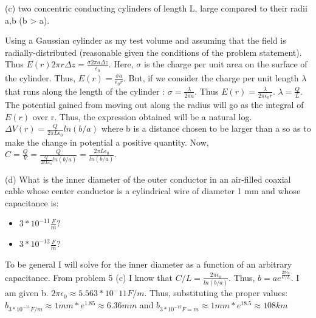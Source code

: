 \begin{homeworkProblem}
\begin{homeworkSection}{(c)}
two concentric conducting cylinders of length L, large compared to their radii a,b (b > a). 

Using a Gaussian cylinder as my test volume and assuming that the field is radially-distributed (reasonable given the conditions of the problem statement). Thus $E(r) 2 \pi r \Delta z = \frac{\sigma 2 \pi a \Delta z}{\epsilon_0}$. Here, $\sigma$ is the charge per unit area on the surface of the cylinder. Thus, $E(r) = \frac{\sigma a}{\epsilon_0 r}$. But, if we consider the charge per unit length $\lambda$ that runs along the length of the cylinder : $\sigma = \frac{\lambda}{2 \pi a}$. Thus $E(r) = \frac{\lambda}{2\pi \epsilon_0 r}$. $\lambda = \frac{Q}{L}$. The potential gained from moving out along the radius will go as the integral of $E(r)$ over r. Thus, the expression obtained will be a natural log. $\Delta V(r) = \frac{Q}{2\pi L \epsilon_0} ln(b/a)$ where b is a distance chosen to be larger than a so as to make the change in potential a positive quantity. Now, $C = \frac{Q}{V} = \frac{Q}{\frac{Q}{2\pi L \epsilon_0} ln(b/a)} = \frac{2 \pi L \epsilon_0}{ln(b/a)}$. 

\end{homeworkSection}

\begin{homeworkSection}{(d)}
What is the inner diameter of the outer conductor in an air-filled coaxial cable 
whose center conductor is a cylindrical wire of diameter 1 mm and whose 
capacitance is:

\begin{itemize}
	\item $ 3*10^{-11} \frac{F}{m}?$
	\item $ 3*10^{-12} \frac{F}{m}?$
\end{itemize}

To be general I will solve for the inner diameter as a function of an arbitrary capacitance. From problem 5 (c) I know that $C/L = \frac{2 \pi \epsilon_0}{ln(b/a)}$. Thus, $ b = a e^{\frac{2 \pi \epsilon_0}{C/L}}$. I am given b. $2\pi \epsilon_0 \approx 5.563*10^-11 F/m$. Thus, substituting the proper values: $b_{3*10^{-11} F/m} \approx 1 mm * e^{1.85} \approx 6.36 mm$ and $b_{3*10^{-12} F=m} \approx 1 mm * e^{18.5} \approx 108 km $

\end{homeworkSection}

\end{homeworkProblem}